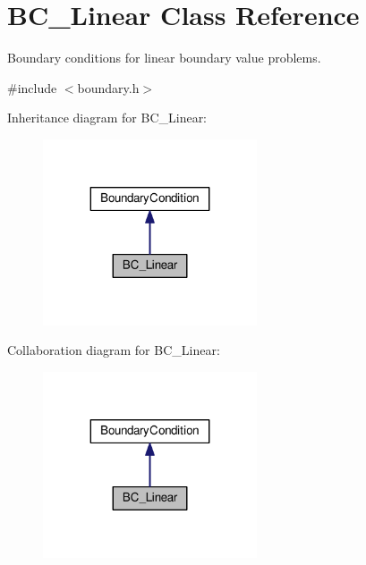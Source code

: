 \hypertarget{classBC__Linear}{}\section{B\+C\+\_\+\+Linear Class Reference}
\label{classBC__Linear}


Boundary conditions for linear boundary value problems.  




{\ttfamily \#include $<$boundary.\+h$>$}



Inheritance diagram for B\+C\+\_\+\+Linear\+:\nopagebreak
\begin{figure}[H]
\begin{center}
\leavevmode
\includegraphics[width=179pt]{classBC__Linear__inherit__graph}
\end{center}
\end{figure}


Collaboration diagram for B\+C\+\_\+\+Linear\+:\nopagebreak
\begin{figure}[H]
\begin{center}
\leavevmode
\includegraphics[width=179pt]{classBC__Linear__coll__graph}
\end{center}
\end{figure}
